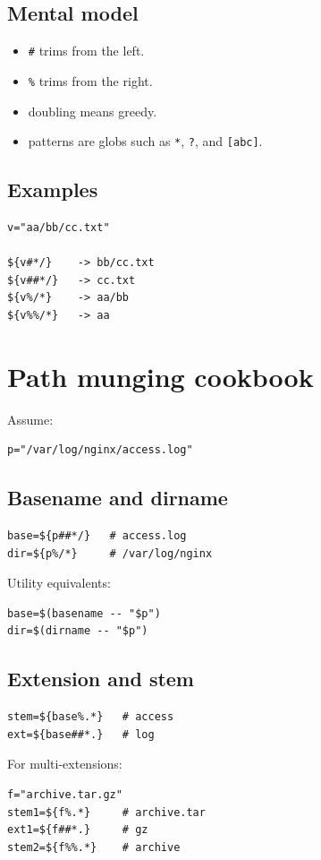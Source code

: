 \documentclass[11pt]{article}
\begin{document}
\subsection{Mental model}
\begin{itemize}
\item \texttt{\#} trims from the left.
\item \texttt{\%} trims from the right.
\item doubling means greedy.
\item patterns are globs such as \texttt{*}, \texttt{?}, and \texttt{[abc]}.
\end{itemize}

\subsection{Examples}
\begin{lstlisting}
v="aa/bb/cc.txt"

${v#*/}    -> bb/cc.txt
${v##*/}   -> cc.txt
${v%/*}    -> aa/bb
${v%%/*}   -> aa
\end{lstlisting}

\section{Path munging cookbook}
Assume:
\begin{lstlisting}
p="/var/log/nginx/access.log"
\end{lstlisting}

\subsection{Basename and dirname}
\begin{lstlisting}
base=${p##*/}   # access.log
dir=${p%/*}     # /var/log/nginx
\end{lstlisting}

Utility equivalents:
\begin{lstlisting}
base=$(basename -- "$p")
dir=$(dirname -- "$p")
\end{lstlisting}

\subsection{Extension and stem}
\begin{lstlisting}
stem=${base%.*}   # access
ext=${base##*.}   # log
\end{lstlisting}

For multi-extensions:
\begin{lstlisting}
f="archive.tar.gz"
stem1=${f%.*}     # archive.tar
ext1=${f##*.}     # gz
stem2=${f%%.*}    # archive
\end{lstlisting}
\end{document}
